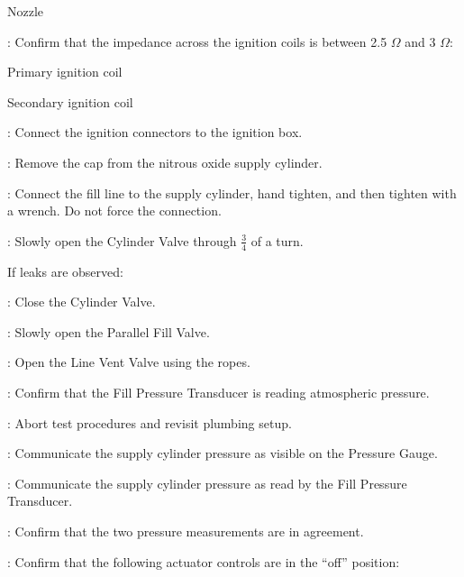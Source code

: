 \begin{checklist}
\begin {checklist}
        \item Nozzle
    \end {checklist}
    \item \secondary: Confirm that the impedance across the ignition coils is between 2.5 $\Omega$ and 3 $\Omega$:
    \begin{checklist}
            \item Primary ignition coil
            \item Secondary ignition coil
    \end{checklist}
    \item \secondary: Connect the ignition connectors to the ignition box.
    \item \primary{}: Remove the cap from the nitrous oxide supply cylinder.
    \item \primary{}: Connect the fill line to the supply cylinder, hand tighten, and then tighten with a wrench. Do not force the connection.
    \item \primary: Slowly open the Cylinder Valve through $\frac{3}{4}$ of a turn.
    \begin{checklist}[label=$\bullet$]
        \item If leaks are observed:
        \begin{checklist}
            \item \primary{}: Close the Cylinder Valve.
            \item \primary{}: Slowly open the Parallel Fill Valve.
            \item \primary: Open the Line Vent Valve using the ropes.
            \item \daq{}: Confirm that the Fill Pressure Transducer is reading atmospheric pressure.
            \item \ops{}: Abort test procedures and revisit plumbing setup.
        \end{checklist}
    \end{checklist}
    \item \primary{}: Communicate the supply cylinder pressure as visible on the Pressure Gauge.
    \item \daq{}: Communicate the supply cylinder pressure as read by the Fill Pressure Transducer.
    \item \daq{}: Confirm that the two pressure measurements are in agreement.
    \item \secondary: Confirm that the following actuator controls are in the ``off'' position:
    \begin{checklist}

\end{checklist}
\end{checklist}
